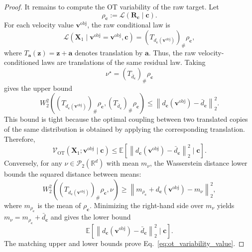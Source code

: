 \documentclass[10pt,twocolumn,letterpaper]{article}
\begin{document}
\begin{proof}
It remains to compute the OT variability of the raw target. Let
\[
    \rho_{\mathbf c}
    :=
    \mathcal L(\mathbf R_{\mathbf c}\mid\mathbf c).
\]
For each velocity value $\mathbf v^\text{obj}$, the raw conditional law is
\[
    \mathcal L
    (
        \mathbf X_1
        \mid
        \mathbf v^\text{obj}=\mathbf v^\text{obj},
        \mathbf c
    )
    =
    (T_{d_{\mathbf c}(\mathbf v^\text{obj})})_{\#}\rho_{\mathbf c},
\]
where $T_{\mathbf a}(\mathbf z)=\mathbf z+\mathbf a$ denotes translation by
$\mathbf a$. Thus, the raw velocity-conditioned laws are translations of the
same residual law. Taking
\[
    \nu^\star
    =
    (T_{\bar d_{\mathbf c}})_{\#}\rho_{\mathbf c}
\]
gives the upper bound
\[
    W_2^2
    \left(
        (T_{d_{\mathbf c}(\mathbf v^\text{obj})})_{\#}\rho_{\mathbf c},
        (T_{\bar d_{\mathbf c}})_{\#}\rho_{\mathbf c}
    \right)
    \le
    \left\|
        d_{\mathbf c}(\mathbf v^\text{obj})
        -
        \bar d_{\mathbf c}
    \right\|_2^2.
\]
This bound is tight because the optimal coupling between two translated copies
of the same distribution is obtained by applying the corresponding translation.
Therefore,
\[
    \mathcal V_{\mathrm{OT}}
    (
        \mathbf X_1;
        \mathbf v^\text{obj}
        \mid
        \mathbf c
    )
    \le
    \mathbb E
    \left[
        \left\|
            d_{\mathbf c}(\mathbf v^\text{obj})
            -
            \bar d_{\mathbf c}
        \right\|_2^2
        \mid
        \mathbf c
    \right].
\]
Conversely, for any $\nu\in\mathcal P_2(\mathbb R^d)$ with mean
$m_{\nu}$, the Wasserstein distance lower bounds the squared distance between
means:
\[
    W_2^2
    \left(
        (T_{d_{\mathbf c}(\mathbf v^\text{obj})})_{\#}\rho_{\mathbf c},
        \nu
    \right)
    \ge
    \left\|
        m_{\rho_{\mathbf c}}
        +
        d_{\mathbf c}(\mathbf v^\text{obj})
        -
        m_{\nu}
    \right\|_2^2,
\]
where $m_{\rho_{\mathbf c}}$ is the mean of $\rho_{\mathbf c}$. Minimizing the
right-hand side over $m_{\nu}$ yields
$m_{\nu}=m_{\rho_{\mathbf c}}+\bar d_{\mathbf c}$ and gives the lower bound
\[
    \mathbb E
    \left[
        \left\|
            d_{\mathbf c}(\mathbf v^\text{obj})
            -
            \bar d_{\mathbf c}
        \right\|_2^2
        \mid
        \mathbf c
    \right].
\]
The matching upper and lower bounds prove
Eq.~\eqref{eq:ot_variability_value}.


\end{proof}
\end{document}
